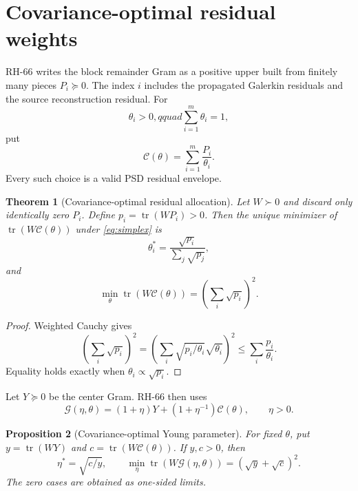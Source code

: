 \documentclass[11pt]{article}
\newtheorem{theorem}{Theorem}[section]
\newtheorem{proposition}[theorem]{Proposition}
\newcommand{\tr}{\operatorname{tr}}
\begin{document}
\section{Covariance-optimal residual weights}
\label{sec:weights}

RH-66 writes the block remainder Gram as a positive upper built from finitely
many pieces $P_i\succeq0$.  The index $i$ includes the propagated Galerkin
residuals and the source reconstruction residual.  For
\begin{equation}
 \theta_i>0,qquad\sum_{i=1}^m\theta_i=1,
 \label{eq:simplex}
\end{equation}
put
\begin{equation}
 \mathcal C(\theta)=\sum_{i=1}^m\frac{P_i}{\theta_i}.
 \label{eq:residual-envelope}
\end{equation}
Every such choice is a valid PSD residual envelope.

\begin{theorem}[Covariance-optimal residual allocation]
\label{thm:residual-optimum}
Let $W\succ0$ and discard only identically zero $P_i$.  Define
$p_i=\tr(WP_i)>0$.  Then the unique minimizer of
$\tr(W\mathcal C(\theta))$ under \eqref{eq:simplex} is
\begin{equation}
 \theta_i^*=\frac{\sqrt{p_i}}{\sum_j\sqrt{p_j}},
 \label{eq:theta-optimum}
\end{equation}
and
\begin{equation}
 \min_\theta\tr(W\mathcal C(\theta))
 =\left(\sum_i\sqrt{p_i}\right)^2.
 \label{eq:residual-value}
\end{equation}
\end{theorem}

\begin{proof}
Weighted Cauchy gives
\[
 \left(\sum_i\sqrt{p_i}\right)^2
 =\left(\sum_i\sqrt{p_i/\theta_i}\sqrt{\theta_i}\right)^2
 \le\sum_i\frac{p_i}{\theta_i}.
\]
Equality holds exactly when $\theta_i\propto\sqrt{p_i}$.
\end{proof}

Let $Y\succeq0$ be the center Gram.  RH-66 then uses
\begin{equation}
 \mathcal G(\eta,\theta)
 =(1+\eta)Y+(1+\eta^{-1})\mathcal C(\theta),
 \qquad \eta>0.
 \label{eq:full-envelope}
\end{equation}

\begin{proposition}[Covariance-optimal Young parameter]
\label{prop:young}
For fixed $\theta$, put
$y=\tr(WY)$ and $c=\tr(W\mathcal C(\theta))$.  If $y,c>0$, then
\begin{equation}
 \eta^*=\sqrt{c/y},
 \qquad
 \min_\eta\tr(W\mathcal G(\eta,\theta))
 =(\sqrt y+\sqrt c)^2.
 \label{eq:eta-optimum}
\end{equation}
The zero cases are obtained as one-sided limits.
\end{proposition}
\end{document}
